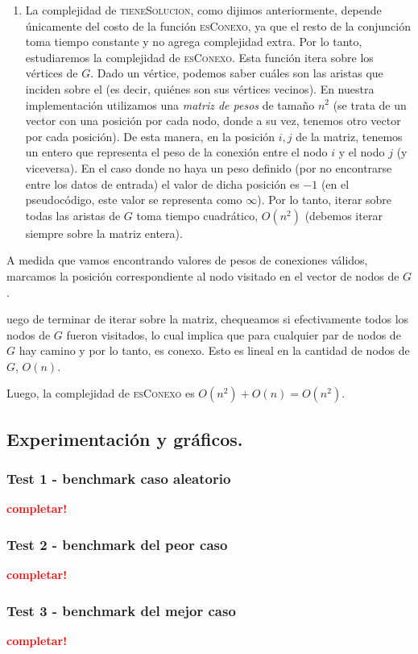 \begin{enumerate}
  \item La complejidad de \textsc{tieneSolucion}, como dijimos anteriormente, depende
  únicamente del costo de la función \textsc{esConexo}, ya que el resto de la conjunción
  toma tiempo constante y no agrega complejidad extra. Por lo tanto, estudiaremos la
  complejidad de \textsc{esConexo}. Esta función itera sobre los vértices de $G$.
  Dado un vértice, podemos saber cuáles son las aristas que inciden sobre el (es decir,
  quiénes son sus vértices vecinos). En nuestra implementación utilizamos una \textit{matriz de
  pesos} de tamaño $n^2$ (se trata de un vector con una posición por cada nodo, donde a su vez,
  tenemos otro vector por cada posición). De esta manera, en la posición $i,j$ de la matriz,
  tenemos un entero que representa el peso de la conexión entre el nodo $i$ y el nodo $j$ (y viceversa).
  En el caso donde no haya un peso definido (por no encontrarse entre los datos de entrada) el valor
 de dicha posición es $-1$ (en el pseudocódigo, este valor se representa como $\infty$).
  Por lo tanto, iterar sobre todas las aristas de $G$ toma tiempo
  cuadrático, $O(n^2)$ (debemos iterar siempre sobre la matriz entera).
\end{enumerate}

A medida que vamos encontrando valores de pesos de conexiones válidos, marcamos la posición
correspondiente al nodo visitado en el vector de nodos de $G$.

uego de terminar de iterar sobre la matriz, chequeamos si efectivamente todos los nodos de $G$
fueron visitados, lo cual implica que para cualquier par de nodos de $G$ hay camino y por lo
tanto, es conexo. Esto es lineal en la cantidad de nodos de $G$, $O(n)$.

Luego, la complejidad de \textsc{esConexo} es $O(n^2) + O(n) = O(n^2)$.

\newpage
\subsection{Experimentación y gráficos.}

\vspace*{0.3cm}

\subsubsection{Test 1 - benchmark caso aleatorio}

\textcolor{red}{\textbf{completar!}}


\newpage
\subsubsection{Test 2 - benchmark del peor caso}

\textcolor{red}{\textbf{completar!}}


\newpage
\subsubsection{Test 3 - benchmark del mejor caso}

\textcolor{red}{\textbf{completar!}}
